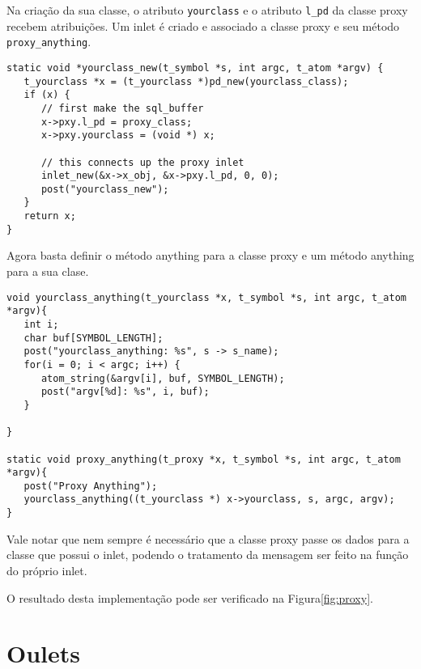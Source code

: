 Na criação da sua classe, o atributo \texttt{yourclass} e o atributo \texttt{l\_pd} da
classe proxy recebem atribuições.
Um inlet é criado e associado a classe proxy e seu método \texttt{proxy\_anything}.

\begin{lstlisting}[caption=Criação da classe com um inlet proxy]
static void *yourclass_new(t_symbol *s, int argc, t_atom *argv) {
   t_yourclass *x = (t_yourclass *)pd_new(yourclass_class);
   if (x) {
      // first make the sql_buffer
      x->pxy.l_pd = proxy_class;
      x->pxy.yourclass = (void *) x;
      
      // this connects up the proxy inlet
      inlet_new(&x->x_obj, &x->pxy.l_pd, 0, 0);
      post("yourclass_new");
   }
   return x;
}
\end{lstlisting}

Agora basta definir o método anything para a classe proxy e um método anything
para a sua clase.

\begin{lstlisting}[caption=Passagem de dados da classe proxy para a classe principal]
void yourclass_anything(t_yourclass *x, t_symbol *s, int argc, t_atom *argv){
   int i;
   char buf[SYMBOL_LENGTH];
   post("yourclass_anything: %s", s -> s_name);
   for(i = 0; i < argc; i++) {
      atom_string(&argv[i], buf, SYMBOL_LENGTH);
      post("argv[%d]: %s", i, buf);
   }

}

static void proxy_anything(t_proxy *x, t_symbol *s, int argc, t_atom *argv){
   post("Proxy Anything");
   yourclass_anything((t_yourclass *) x->yourclass, s, argc, argv);
}
\end{lstlisting}

Vale notar que nem sempre é necessário que a classe proxy passe os dados para a
classe que possui o inlet, podendo o tratamento da mensagem ser feito na função
do próprio inlet.

O resultado desta implementação pode ser verificado na Figura\ref{fig:proxy}.


\section{Oulets}

